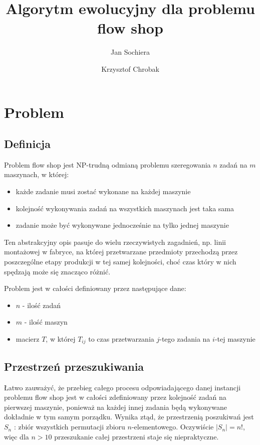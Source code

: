 \documentclass[11pt, a4wide]{article}
\title{Algorytm ewolucyjny dla problemu flow shop}
\author{Jan Sochiera \and Krzysztof Chrobak}
\begin{document}
\maketitle
\tableofcontents

\section{Problem}
\subsection{Definicja}
Problem flow shop jest NP-trudną odmianą problemu szeregowania $n$ zadań na $m$ maszynach, w której:
\begin{itemize}
  \item każde zadanie musi zostać wykonane na każdej maszynie
  \item kolejność wykonywania zadań na wszystkich maszynach jest taka sama
  \item zadanie może być wykonywane jednocześnie na tylko jednej maszynie
\end{itemize}
Ten abstrakcyjny opis pasuje do wielu rzeczywistych zagadnień, np. linii montażowej w 
fabryce, na której przetwarzane przedmioty przechodzą przez poszczególne etapy produkcji w tej
samej kolejności, choć czas który w nich spędzają może się znacząco różnić.

Problem jest w całości definiowany przez następujące dane:
\begin{itemize}
  \item $n$ - ilość zadań
  \item $m$ - ilość maszyn 
  \item macierz $T$, w której $T_{ij}$ to czas przetwarzania $j$-tego zadania na $i$-tej maszynie
\end{itemize}

\subsection{Przestrzeń przeszukiwania}
Łatwo zauważyć, że przebieg całego procesu odpowiadającego danej instancji problemu flow shop
jest w całości zdefiniowany przez kolejność zadań na pierwszej maszynie, ponieważ na każdej innej
zadania będą wykonywane dokładnie w tym samym porządku. Wynika ztąd, że przestrzenią poszukiwań jest
$S_n$ : zbiór wszystkich permutacji zbioru $n$-elementowego. Oczywiście $|S_n| = n!$, więc dla $n>10$
przeszukanie całej przestrzeni staje się niepraktyczne.
\end{document}

